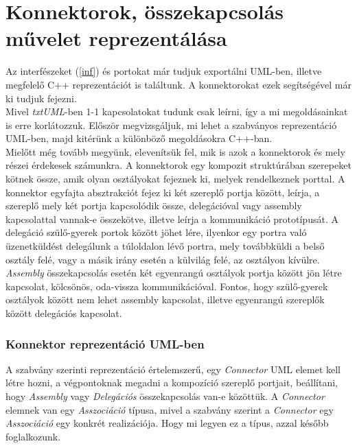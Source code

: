 \documentclass[a4paper,12pt]{report}
\begin{document}
\section{Konnektorok, összekapcsolás művelet reprezentálása} \label{connect}
Az interfészeket (\ref{inf}) és portokat már tudjuk exportálni UML-ben, illetve megfelelő C++ reprezentációt is találtunk. A konnektorokat ezek segítségével már ki tudjuk fejezni. \\
Mivel \textit{txtUML}-ben 1-1 kapcsolatokat tudunk csak leírni, így a mi megoldásainkat is erre korlátozzuk. Először megvizsgáljuk, mi lehet a szabványos reprezentáció UML-ben, majd kitérünk a különböző megoldásokra C++-ban. \\
Mielőtt még tovább megyünk, elevenítsük fel, mik is azok a konnektorok és mely részei érdekesek számunkra. A konnektorok egy kompozit struktúrában szerepeket kötnek össze, amik olyan osztályokat fejeznek ki, melyek rendelkeznek porttal. A konnektor egyfajta absztrakciót fejez ki két szereplő portja között, leírja, a szereplő mely két portja kapcsolódik össze, delegációval vagy assembly kapcsolattal vannak-e összekötve, illetve leírja a kommunikáció prototípusát. A delegáció szülő-gyerek portok között jöhet lére, ilyenkor egy portra való üzenetküldést delegálunk a túloldalon lévő portra, mely továbbküldi a belső osztály felé, vagy a másik irány esetén a külvilág felé, az osztályon kívülre. \textit{Assembly} összekapcsolás esetén két egyenrangú osztályok portja között jön létre kapcsolat, kölcsönös, oda-vissza kommunikációval. Fontos, hogy szülő-gyerek osztályok között nem lehet assembly kapcsolat, illetve egyenrangú szereplők között delegációs kapcsolat.
\subsubsection{Konnektor reprezentáció UML-ben}
A szabvány szerinti reprezentáció értelemszerű, egy \textit{Connector} UML elemet kell létre hozni, a végpontoknak megadni a kompozíció szereplő portjait, beállítani, hogy \textit{Assembly} vagy \textit{Delegációs} összekapcsolás van-e közöttük. A \textit{Connector} elemnek van egy \textit{Asszociáció} típusa, mivel a szabvány szerint a \textit{Connector} egy \textit{Asszociáció} egy konkrét realizációja. Hogy mi legyen ez a típus, azzal később foglalkozunk.
\end{document}
